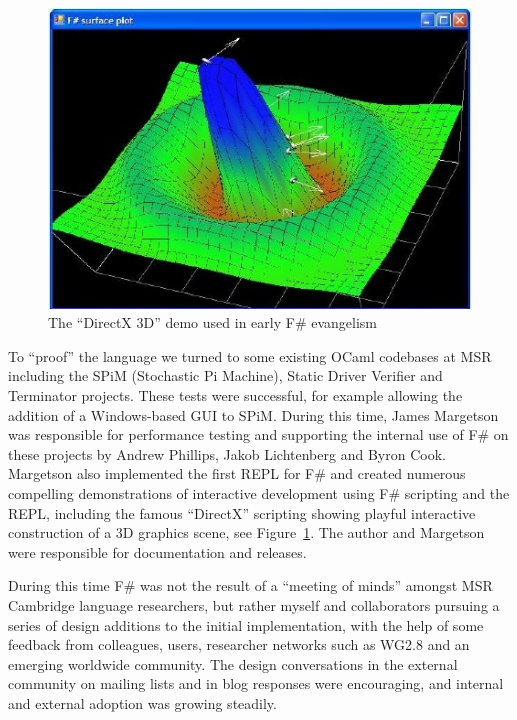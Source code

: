 \documentclass[acmsmall,screen]{acmart}
\begin{document}
\begin{figure}
  \begin{center}
  \includegraphics[width=0.9\linewidth]{directx2.jpg}
  \end{center}
  \caption{The ``DirectX 3D'' demo used in early F\# evangelism}
  \label{fig:directx}
\end{figure}

To “proof” the language we turned to some existing OCaml codebases at MSR including the SPiM (Stochastic Pi Machine), Static Driver Verifier
and Terminator projects.  These tests were successful, for example allowing the addition of a Windows-based GUI to SPiM.   During this time,
James Margetson was responsible for performance testing and supporting the internal use of F\# on these projects by Andrew Phillips, Jakob
Lichtenberg and Byron Cook. Margetson also implemented the first REPL for F\# and created numerous compelling demonstrations of interactive
development using F\# scripting and the REPL, including the famous ``DirectX'' scripting showing playful interactive construction of a 3D graphics scene, see
Figure~\ref{fig:directx}.
The author and Margetson were responsible for documentation and releases.

During this time F\# was not the result of a “meeting of minds” amongst MSR Cambridge language researchers, but rather myself and collaborators
pursuing a series of design additions to the initial implementation, with the help of some feedback from colleagues, users, researcher networks
such as WG2.8 and an emerging worldwide community.  The design conversations in the external community on mailing lists and in blog responses
were encouraging, and internal and external adoption was growing steadily. 
\end{document}
